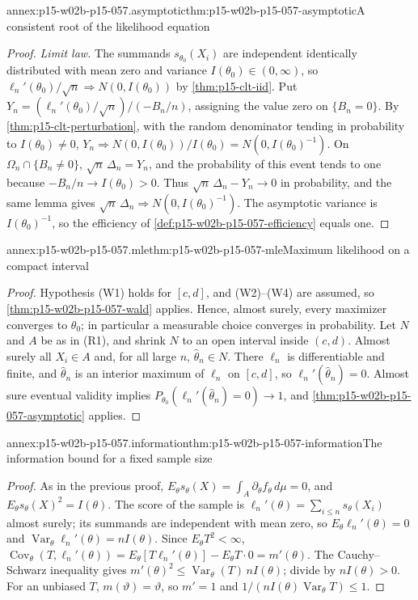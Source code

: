 \begin{annexitem}{annex:p15-w02b-p15-057.asymptotic}{thm:p15-w02b-p15-057-asymptotic}{A consistent root of the likelihood equation}
\begin{proof}
\emph{Limit law.} The summands \(s_{\theta_0}(X_i)\) are independent
identically distributed with mean zero and variance
\(I(\theta_0)\in(0,\infty)\), so
\(\ell_n'(\theta_0)/\sqrt n\Rightarrow N(0,I(\theta_0))\) by
\cref{thm:p15-clt-iid}. Put
\(Y_n=(\ell_n'(\theta_0)/\sqrt n)/(-B_n/n)\), assigning the value zero on
\(\{B_n=0\}\). By \cref{thm:p15-clt-perturbation}, with the random
denominator tending in probability to \(I(\theta_0)\neq0\),
\(Y_n\Rightarrow N(0,I(\theta_0))/I(\theta_0)=N(0,I(\theta_0)^{-1})\). On
\(\Omega_n\cap\{B_n\neq0\}\), \(\sqrt n\,\Delta_n=Y_n\), and the
probability of this event tends to one because \(-B_n/n\to
I(\theta_0)>0\). Thus \(\sqrt n\,\Delta_n-Y_n\to0\) in probability, and the
same lemma gives \(\sqrt n\,\Delta_n\Rightarrow N(0,I(\theta_0)^{-1})\).
The asymptotic variance is \(I(\theta_0)^{-1}\), so the efficiency of
\cref{def:p15-w02b-p15-057-efficiency} equals one.
\end{proof}
\end{annexitem}

\begin{annexitem}{annex:p15-w02b-p15-057.mle}{thm:p15-w02b-p15-057-mle}{Maximum likelihood on a compact interval}
\begin{proof}
Hypothesis (W1) holds for \([c,d]\), and (W2)--(W4) are assumed, so
\cref{thm:p15-w02b-p15-057-wald} applies. Hence, almost surely, every maximizer converges to \(\theta_0\);
in particular a measurable choice converges in probability. Let \(N\)
and \(A\) be as in (R1), and shrink \(N\) to an open interval inside
\((c,d)\). Almost surely all \(X_i\in A\) and, for all large \(n\),
\(\widehat\theta_n\in N\). There \(\ell_n\) is differentiable and finite,
and \(\widehat\theta_n\) is an interior maximum of \(\ell_n\) on
\([c,d]\), so \(\ell_n'(\widehat\theta_n)=0\). Almost sure eventual
validity implies \(P_{\theta_0}(\ell_n'(\widehat\theta_n)=0)\to1\), and
\cref{thm:p15-w02b-p15-057-asymptotic} applies.
\end{proof}
\end{annexitem}

\begin{annexitem}{annex:p15-w02b-p15-057.information}{thm:p15-w02b-p15-057-information}{The information bound for a fixed sample size}
\begin{proof}
As in the previous proof, \(E_\theta s_\theta(X)=\int_A\partial_\theta
f_\theta\,d\mu=0\), and \(E_\theta s_\theta(X)^2=I(\theta)\). The score of
the sample is \(\ell_n'(\theta)=\sum_{i\leq n}s_\theta(X_i)\) almost surely;
its summands are independent with mean zero, so
\(E_\theta\ell_n'(\theta)=0\) and
\(\operatorname{Var}_\theta\ell_n'(\theta)=nI(\theta)\). Since
\(E_\theta T^2<\infty\),
\(\operatorname{Cov}_\theta(T,\ell_n'(\theta))=E_\theta[T\ell_n'(\theta)]
-E_\theta T\cdot0=m'(\theta)\). The Cauchy--Schwarz inequality gives
\(m'(\theta)^2\leq\operatorname{Var}_\theta(T)\,nI(\theta)\); divide by
\(nI(\theta)>0\). For an unbiased \(T\), \(m(\vartheta)=\vartheta\), so
\(m'=1\) and \(1/(nI(\theta)\operatorname{Var}_\theta T)\leq1\).
\end{proof}
\end{annexitem}


